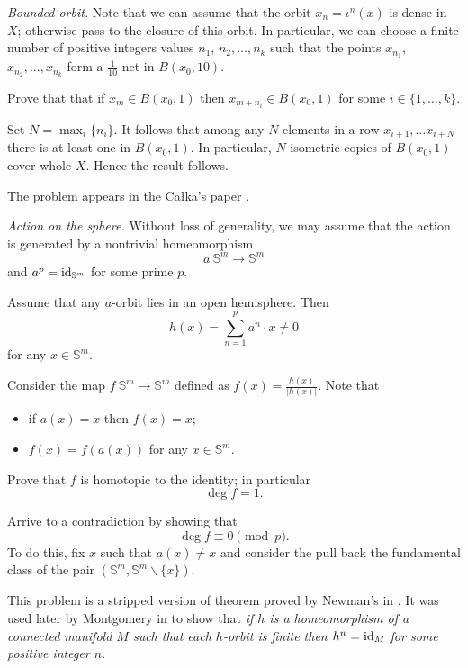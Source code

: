 \textit{Bounded orbit.}
Note that we can assume that the orbit $x_n=\iota^n(x)$ is dense in $X$;
otherwise pass to the closure of this orbit.
In particular, we can choose a finite number of positive integers values $n_1$, $n_2,\dots,n_k$
such that the points $x_{n_1}$, $x_{n_2},\dots,x_{n_k}$ form a $\tfrac1{10}$-net in $B(x_0,10)$.

Prove that that if $x_m\in B(x_0,1)$ then $x_{m+n_i}\in B(x_0,1)$ for some $i\in\{1,\dots,k\}$.

Set $N=\max_i\{n_i\}$.
It follows 
that among any $N$ elements in a row $x_{i+1},\dots x_{i+N}$
there is at least one in $B(x_0,1)$.
In particular, $N$ isometric copies of $B(x_0,1)$ cover whole $X$.
Hence the result follows.

The problem appears in the Ca{\l}ka's paper \cite{calka}.

\textit{Action on the sphere.}
Without loss of generality, we may assume that the action is generated by a nontrivial homeomorphism 
\[a\:\mathbb{S}^m\to\mathbb{S}^m\] 
and $a^p=\operatorname{\rm id}_{\mathbb{S}^m}$ for some prime $p$.

Assume that any $a$-orbit lies in an open hemisphere.
Then 
\[h(x)=\sum_{n=1}^p a^n\cdot x\ne0\]
for any $x\in\mathbb{S}^m$.

Consider the map $f\:\mathbb{S}^m\to\mathbb{S}^m$ 
defined as  $f(x)=\tfrac{h(x)}{|h(x)|}$.
Note that 
\begin{itemize}
\item if $a(x)=x$ then $f(x)=x$;
\item $f(x)=f(a(x))$ for any $x\in\mathbb{S}^m$.
\end{itemize}

Prove that $f$ is homotopic to the identity; 
in particular 
\[\deg f=1.\]

Arrive to a contradiction by showing that 
\[\deg f\equiv 0\pmod p.\]
To do this, fix $x$ such that $a(x)\ne x$
and consider the pull back the fundamental class of the pair $(\mathbb{S}^m,\mathbb{S}^m\backslash\{x\})$.

This problem is a stripped version of theorem proved by Newman's in \cite{newman}.
It was used later by Montgomery in \cite{montgomery} 
to show that \emph{if $h$ is a homeomorphism of a connected manifold $M$ such that each $h$-orbit is finite then $h^n=\operatorname{\rm id}_M$ for some positive integer $n$}.


